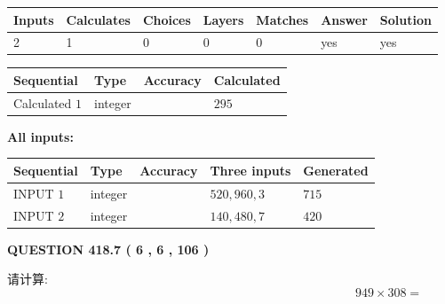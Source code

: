 \documentclass{ctexart}
\begin{document}
 

 
   
   
   
   
\noindent\begin{tabular}{|l|l|l|l|l|l|l|}
 \hline
Inputs & Calculates & Choices & Layers & Matches & Answer & Solution \\ \hline
 2  & 
 1  & 
 0
  & 
 0  & 
 0  & 
  yes & 
  yes 
  \\ \hline
 \end{tabular}
   
   
   
   
\noindent{}
   
   
  
  
\noindent\begin{tabular}{|l|l|l|l|}
\hline
 Sequential & Type & Accuracy & Calculated \\ 
\hline
 
 
  Calculated $  1 $ & integer &  & 
  $ 295 $ 
 \\  \hline  
 \end{tabular}
   
   
   
   
\noindent\vspace{0.1in}\hspace{-0.08in} {\textbf{\Large{All inputs: }}}
   
   
  
  
\noindent\begin{tabular}{|l|l|l|l|l|}
\hline
 Sequential & Type & Accuracy & Three inputs & Generated \\ 
\hline
 
 
  INPUT $  1 $ & integer &  & $
 520
 , 
 960
 , 
 3
 $ & $ 715 $ 
 \\  \hline  
 
 
  INPUT $  2 $ & integer &  & $
 140
 , 
 480
 , 
 7
 $ & $ 420 $ 
 \\  \hline  
 \end{tabular}
   
   
  
\vspace{0.2in}
  
{\textbf{\Large{QUESTION
418.7 
 ( 6 , 6 , 106 )
}}}
  
  
 
请计算:
\begin{equation}
949  \times    %
308 = \nonumber
\end{equation}
 
\end{document}
